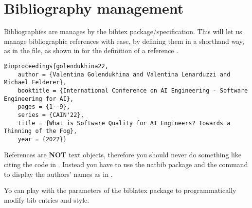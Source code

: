 

\section{Bibliography management}
\label{sec:biblio}

Bibliographies are manages by the bibtex package/specification. This will let us manage bibliographic references with ease, by defining them in a shorthand way, as in the  file, as shown in  for the definition of a reference \cite{golendukhina22}.

\begin{lstlisting}[frame=lines, 
   label={lst:bib}, 
  caption={Bib entry example}]
@inproceedings{golendukhina22,
	author = {Valentina Golendukhina and Valentina Lenarduzzi and Michael Felderer},
	booktitle = {International Conference on AI Engineering - Software Engineering for AI},
	pages = {1--9},
	series = {CAIN'22},
	title = {What is Software Quality for AI Engineers? Towards a Thinning of the Fog},
	year = {2022}}
\end{lstlisting}

References are \textbf{NOT} text objects, therefore you should never do something like citing the code in \cite{islam20}. Instead you have to use the natbib package and the  command to display the authors' names as in \citet{islam20}.

Yo can play with the parameters of the biblatex package to programmatically modify bib entries and style.

\endinput